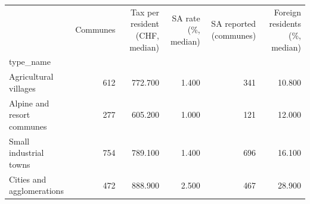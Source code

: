 \begin{tabular}{lrrrrr}
\toprule
 & Communes & Tax per resident (CHF, median) & SA rate (\%, median) & SA reported (communes) & Foreign residents (\%, median) \\
type\_name &  &  &  &  &  \\
\midrule
Agricultural villages & 612 & 772.700 & 1.400 & 341 & 10.800 \\
Alpine and resort communes & 277 & 605.200 & 1.000 & 121 & 12.000 \\
Small industrial towns & 754 & 789.100 & 1.400 & 696 & 16.100 \\
Cities and agglomerations & 472 & 888.900 & 2.500 & 467 & 28.900 \\
\bottomrule
\end{tabular}
